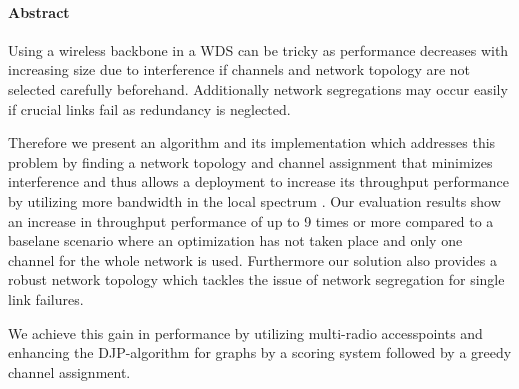 \cleardoublepage

\vspace {2cm}
\begin{center}
\paragraph{Abstract}
\hrulefill
\end{center}
Using a wireless backbone in a \ac{WDS} can be tricky as performance decreases with increasing size due to interference if 
channels and network topology are not selected carefully beforehand. Additionally network segregations may occur easily if 
crucial links fail as redundancy is neglected.

Therefore we present an algorithm and its implementation which addresses this problem by finding a network topology and channel assignment 
that minimizes interference and thus allows a deployment to increase its throughput performance by utilizing more bandwidth in the local spectrum . 
Our evaluation results show an increase in throughput performance of up to 9 times or more compared to a baselane scenario where an optimization has not taken place
and only one channel for the whole network is used.
Furthermore our solution also provides a robust network topology which tackles the issue of network segregation for single link failures.

We achieve this gain in performance by utilizing multi-radio accesspoints and enhancing the \ac{DJP}-algorithm for graphs by a scoring system followed
by a greedy channel assignment.

